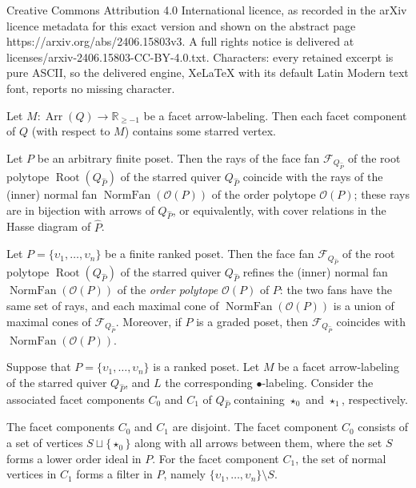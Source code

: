 \documentclass[10pt,a4paper]{amsart}
\newcommand{\Arr}{\operatorname{Arr}}
\newcommand{\F}{\mathcal{F}}
\newcommand{\NF}{\operatorname{NormFan}}
\newcommand{\NP}{\operatorname{Root}}
\newcommand{\OO}{\mathcal{O}}
\newcommand{\R}{\mathbb{R}}
\newcommand{\vv}{\upsilon}
\begin{document}
Creative Commons Attribution 4.0 International licence, as recorded in the arXiv licence metadata for this exact version and shown on the abstract page https://arxiv.org/abs/2406.15803v3. A full rights notice is delivered at licenses/arxiv-2406.15803-CC-BY-4.0.txt. Characters: every retained excerpt is pure ASCII, so the delivered engine, XeLaTeX with its default Latin Modern text font, reports no missing character.
\begin{lemma}\label{lem:containstar}
Let $M:\Arr(Q) \to \R_{\geq -1}$ be a facet arrow-labeling.
Then each facet component of $Q$ (with respect to $M$)
contains some starred vertex.
\end{lemma}

\begin{lemma}\label{lem:rays}
Let $P$ be an arbitrary finite poset.
Then the rays of the 
	face fan $\F_{Q_{\hat{P}}}$ of the root polytope $\NP(Q_{\hat{P}})$
of the starred quiver $Q_{\hat{P}}$
coincide with the rays of the (inner) normal fan $\NF(\OO(P))$ of 
the order polytope $\OO(P)$;  these rays are in bijection 
with arrows of $Q_{\hat{P}}$, or equivalently, with cover relations in 
the Hasse diagram of $\hat{P}$.
\end{lemma}

\begin{theorem}\label{thm:refine}
Let $P=\{\vv_1,\dots,\vv_n\}$ be a finite ranked poset.
	Then the face fan $\F_{Q_{\hat{P}}}$ of the root polytope $\NP(Q_{\hat{P}})$
 of the starred quiver $Q_{\hat{P}}$
refines the (inner) normal fan $\NF(\OO(P))$ of 
the \emph{order polytope} $\mathcal{O}(P)$ of $P$:
the two fans have the same set of rays, and each 
maximal cone of $\NF(\OO(P))$ is a union of maximal cones of 
	$\F_{Q_{\hat{P}}}$.  Moreover, if $P$ is a graded poset, then 
	$\F_{Q_{\hat{P}}}$ coincides with 
 $\NF(\OO(P))$.
\end{theorem}

\begin{lemma} \label{lem:orderideal}
Suppose that $P=\{\vv_1,\dots,\vv_n\}$ is a ranked poset. 
Let $M$ be a facet arrow-labeling of the starred quiver $Q_{\hat{P}}$, and $L$ the corresponding $\bullet$-labeling. Consider the associated facet components  $C_0$ and $C_1$ of $Q_{\hat{P}}$ containing $\star_0$ and $\star_1$, respectively.  

The facet components $C_0$ and $C_1$ are disjoint. The facet component $C_0$ consists of a set of vertices $S\sqcup\{\star_0\}$ along with all arrows between them, where the set $S$ forms a lower order ideal in $P$. For the facet component $C_1$, the set of normal vertices in $C_1$ 
	forms a filter in $P$,
	namely $\{\vv_1,\dots,\vv_n\} \setminus S$. 

\end{lemma}
\end{document}

